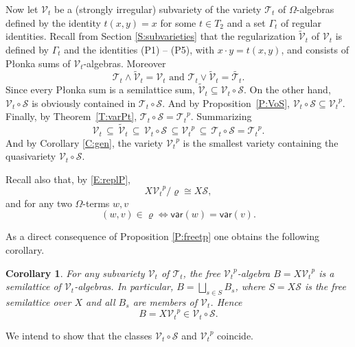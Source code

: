 \documentclass{birkau}
\def\Om{\Omega}
\newcommand{\mcV}{\mathcal{V}}
\newcommand{\mcT}{\mathcal{T}}
\newcommand{\mcS}{\mathcal{S}}
\def\tV{\widetilde{\mcV}}
\def\tT{\widetilde{\mcT_t}}
\def\mf{\mathsf}
\newcommand{\pro}[1]{{#1}^p}
\theoremstyle{plain}
\newtheorem{corollary}[theorem]{Corollary}
\theoremstyle{definition}
\numberwithin{equation}{section}
\begin{document}
Now let $\mcV_t$ be a (strongly irregular) subvariety of the variety $\mcT_t$ of
$\Om$-algebras defined by the identity $ t(x,y) = x$ for some $t \in T_2$ and a set
$\Gamma_t$ of regular identities. Recall from Section \ref{S:subvarieties} that the
regularization $\tV_t$ of $\mcV_t$ is defined by $\Gamma_t$ and the identities (P1) --
(P5), with $x \cdot y = t(x,y)$, and consists of P\l onka sums of $\mcV_t$-algebras. Moreover
\begin{equation*}
\mcT_t \wedge \tV_t = \mcV_t \,\, \mbox{and} \,\, \mcT_t \vee \tV_t = \tT.
\end{equation*}
Since every P\l onka sum is a semilattice sum, $\tV_t \subseteq \mcV_t \circ \mcS$. On the
other hand,  $\mcV_t \circ \mcS$ is obviously contained in $\mcT_t \circ \mcS$. And by
Proposition~\ref{P:VoS}, $\mcV_t \circ \mcS \subseteq \pro{\mcV_t}$.  Finally, by
Theorem~\ref{T:varPt}, $\mcT_t \circ \mcS = \pro{\mcT_t}$. Summarizing
\begin{equation*}
\mcV_t \, \subseteq \, \tV_t \, \subseteq \, \mcV_t \circ \mcS \, \subseteq \pro{\mcV_t}
\, \subseteq \, \mcT_t \circ \mcS = \pro{\mcT_t} .
\end{equation*}
And by Corollary \ref{C:gen}, the variety $\pro{\mcV_t}$ is the smallest variety
containing the quasivariety $\mcV_t \circ \mcS$.

Recall also that, by \eqref{E:replP},
\begin{equation*}
 X\pro{\mcV_t}/\varrho \cong X\mcS,
\end{equation*}
and for any two $\Om$-terms $w, v$
\begin{equation*}
(w,v) \in \varrho \iff \mf{var}(w) = \mf{var}(v).
\end{equation*}

As a direct consequence of Proposition \ref{P:freetp} one obtains the following corollary.

\begin{corollary}\label{C:freePVt}
  For any subvariety $\mcV_t$ of $\mcT_t$, the free $\pro{\mcV_t}$-algebra
  $B = X\pro{\mcV_t}$ is a semilattice of $\mcV_t$-algebras. In particular,
  $B = \bigsqcup_{s \in S} B_s $, where $S = X\mcS$ is the free semilattice over $X$ and
  all $B_s$ are members of $\mcV_t$. Hence
  \begin{equation*}
B = X\pro{\mcV_t} \in \mcV_t \circ \mcS.
\end{equation*}
\end{corollary}

We intend to show that the classes $\mcV_t \circ \mcS$ and $\pro{\mcV_t}$ coincide.
\end{document}
